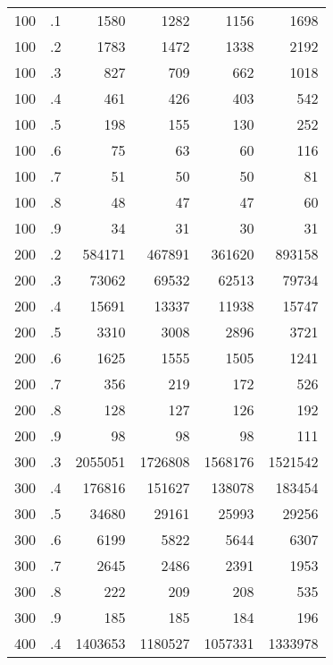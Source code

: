 \begin{table}
\begin{center}
\begin{tabular}{||c|r|r|r|r|r|}
    100       & .1      &1580      &1282    &1156    &1698  \\ 
    100       & .2      &1783      &1472    &1338    &2192  \\ 
    100       & .3      &827       &709     &662     &1018  \\ 
    100       & .4      &461       &426     &403     &542   \\ 
    100       & .5      &198       &155     &130     &252   \\ 
    100       & .6      &75        &63      &60      &116   \\ 
    100       & .7      &51        &50      &50      &81    \\ 
    100       & .8      &48        &47      &47      &60    \\ 
    100       & .9      &34        &31      &30      &31    \\ 
\hline
    200       & .2      &584171    &467891  &361620  &893158  \\ 
    200       & .3      &73062     &69532   &62513   &79734   \\ 
    200       & .4      &15691     &13337   &11938   &15747   \\ 
    200       & .5      &3310      &3008    &2896    &3721    \\ 
    200       & .6      &1625      &1555    &1505    &1241    \\ 
    200       & .7      &356       &219     &172     &526     \\ 
    200       & .8      &128       &127     &126     &192     \\ 
    200       & .9      &98        &98      &98       &111     \\ 
\hline
    300       & .3      &2055051   &1726808 &1568176 &1521542   \\ 
    300       & .4      &176816    &151627  &138078  &183454    \\ 
    300       & .5      &34680     &29161   &25993   &29256     \\ 
    300       & .6      &6199      &5822    &5644    &6307      \\ 
    300       & .7      &2645      &2486    &2391    &1953      \\ 
    300       & .8      &222       &209     &208     &535       \\ 
    300       & .9      &185       &185     &184     &196       \\ 
\hline
    400       & .4      &1403653   &1180527 &1057331 &1333978    \\ 

\end{tabular}
\end{center}
\end{table}
